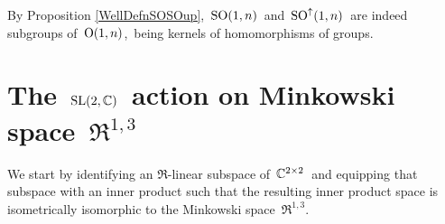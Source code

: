 
\vskip 0.5cm
\begin{remark}
\mbox{}
\vskip 0.1cm
\noindent
By Proposition \ref{WellDefnSOSOup},
\,$\textnormal{SO}(1,n)$\, and \,$\textnormal{SO}^{\uparrow}(1,n)$\,
are indeed subgroups of
\,$\textnormal{O}(1,n)$,\,
being kernels of homomorphisms of groups.
\end{remark}



\vskip 0.5cm
\section{The \,$\textnormal{SL}(2,\mathbb{C})$\, action on Minkowski space \,$\Re^{1,3}$}


We start by identifying an $\Re$-linear subspace of \,$\mathbb{C}^{2 \times 2}$\, 
and equipping that subspace with an inner product such that the resulting inner product space
is isometrically isomorphic to the Minkowski space \,$\Re^{1,3}$.\,

